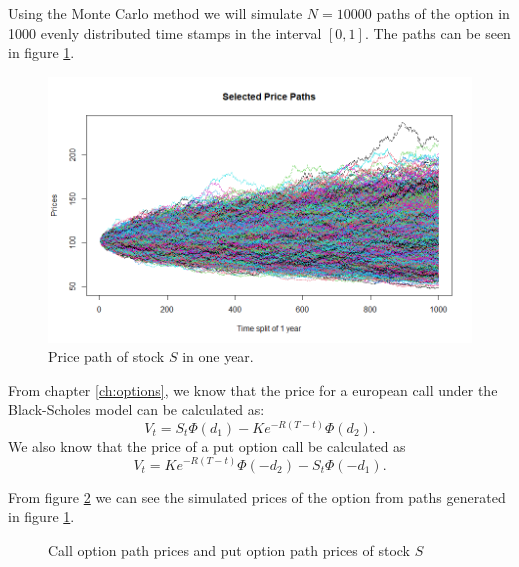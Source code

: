 \documentclass[a4paper, 12pt]{article}
\theoremstyle{definition}
\theoremstyle{plain}
\theoremstyle{definition}
\begin{document}
Using the Monte Carlo method we will simulate 
$N = 10000$ paths of the option in 1000 evenly 
distributed time stamps in the interval $[0,1]$.
The paths can be seen in 
figure \ref{fig:price_path}.

\begin{figure}[!ht]
    \centering
    \caption{Price path of stock $S$ in one year.}
    \label{fig:price_path}
    \includegraphics[scale=0.65]{price_paths.png}
 \end{figure}
 
From chapter \ref{ch:options}, we know 
that the price for a european call under the Black-Scholes model
can be calculated as:
$$
    V_t = S_t\Phi(d_1) - Ke^{-R(T-t)}\Phi(d_2).
$$
We also know that the price of a put option call be calculated as
$$
    V_t = Ke^{-R(T-t)}\Phi(-d_2)-S_t\Phi(-d_1).
$$    

From figure \ref{fig:option_prices} we can see 
the simulated prices
of the option from paths 
generated in figure \ref{fig:price_path}. 

\begin{figure}[ht!]
    \centering

    \caption{Call option path prices 
            and put option path prices of stock $S$}
 \label{fig:option_prices}
 \end{figure}
 
\end{document}
